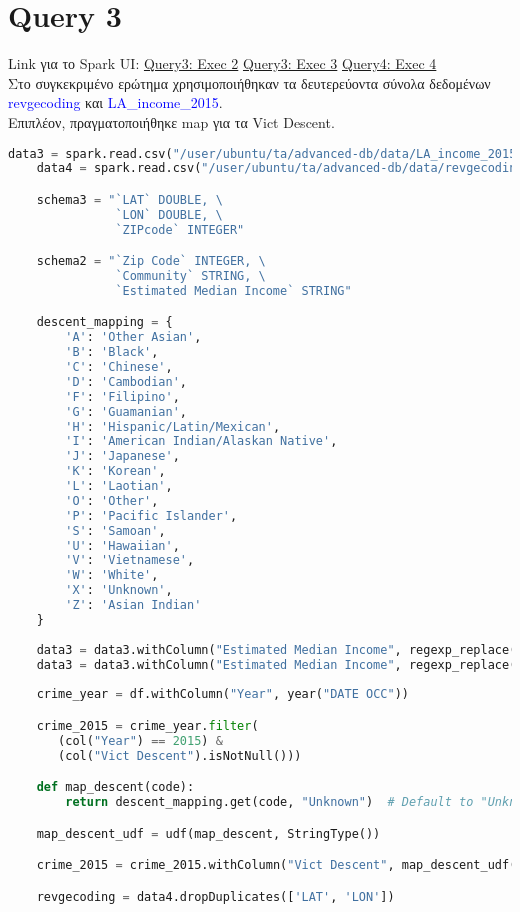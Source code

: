 \documentclass{article}
\begin{document}
\vspace{1\baselineskip}

\section{Query 3}

Link για το Spark UI: 
\href{http://83.212.81.191:18080/history/application_1705357398960_0014/jobs/} {Query3: Exec 2} 
\href{http://83.212.81.191:18080/history/application_1705357398960_0015/jobs/} {Query3: Exec 3} 
\href{http://83.212.81.191:18080/history/application_1705357398960_0016/jobs/} {Query4: Exec 4} \\
Στο συγκεκριμένο ερώτημα χρησιμοποιήθηκαν τα δευτερεύοντα σύνολα δεδομένων 
\textcolor{blue}{revgecoding} και \textcolor{blue}{LA\_income\_2015}. \\
Επιπλέον, πραγματοποιήθηκε map για τα Vict  Descent. \\

\begin{lstlisting}[language = Python]
    data3 = spark.read.csv("/user/ubuntu/ta/advanced-db/data/LA_income_2015.csv", header=True, schema=schema2)
    data4 = spark.read.csv("/user/ubuntu/ta/advanced-db/data/revgecoding.csv", header=True, schema=schema3)

    schema3 = "`LAT` DOUBLE, \
               `LON` DOUBLE, \
               `ZIPcode` INTEGER"

    schema2 = "`Zip Code` INTEGER, \
	           `Community` STRING, \
	           `Estimated Median Income` STRING"

    descent_mapping = {
        'A': 'Other Asian',
        'B': 'Black',
        'C': 'Chinese',
        'D': 'Cambodian',
        'F': 'Filipino',
        'G': 'Guamanian',
        'H': 'Hispanic/Latin/Mexican',
        'I': 'American Indian/Alaskan Native',
        'J': 'Japanese',
        'K': 'Korean',
        'L': 'Laotian',
        'O': 'Other',
        'P': 'Pacific Islander',
        'S': 'Samoan',
        'U': 'Hawaiian',
        'V': 'Vietnamese',
        'W': 'White',
        'X': 'Unknown',
        'Z': 'Asian Indian'
    }
    
    data3 = data3.withColumn("Estimated Median Income", regexp_replace(col("Estimated Median Income"), "\$", ""))
    data3 = data3.withColumn("Estimated Median Income", regexp_replace(col("Estimated Median Income"), ",", "").cast("float"))
     
    crime_year = df.withColumn("Year", year("DATE OCC"))

    crime_2015 = crime_year.filter(
       (col("Year") == 2015) & 
       (col("Vict Descent").isNotNull()))

    def map_descent(code):
        return descent_mapping.get(code, "Unknown")  # Default to "Unknown" if code not found

    map_descent_udf = udf(map_descent, StringType())

    crime_2015 = crime_2015.withColumn("Vict Descent", map_descent_udf(crime_2015["Vict Descent"]))

    revgecoding = data4.dropDuplicates(['LAT', 'LON'])
\end{lstlisting}
\end{document}

